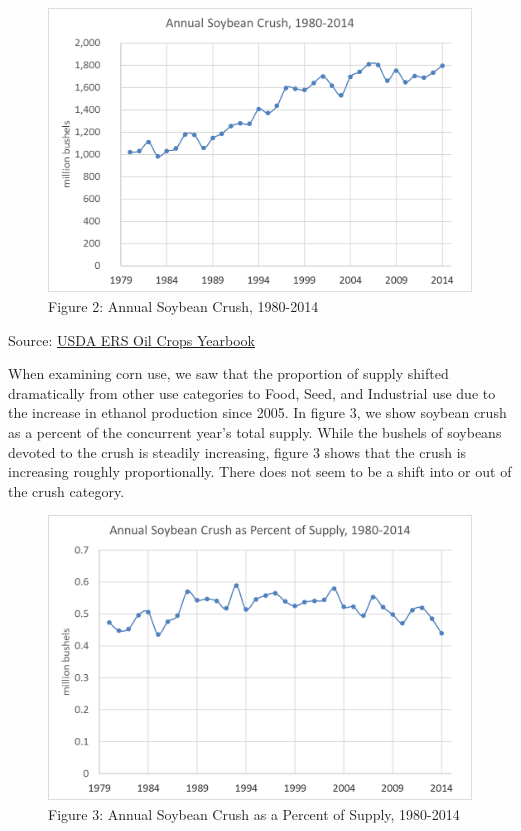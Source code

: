 \documentclass[]{book}
\theoremstyle{definition}
\theoremstyle{definition}
\theoremstyle{remark}
\begin{document}
\begin{figure}[htbp]
\centering
\includegraphics{Excel-files/ForecastingUseSoy-OilCropsYearbook_files/image005.png}
\caption{Figure 2: Annual Soybean Crush, 1980-2014}
\end{figure}

Source:
\href{http://www.ers.usda.gov/data-products/oil-crops-yearbook.aspx}{USDA
ERS Oil Crops Yearbook}

When examining corn use, we saw that the proportion of supply shifted
dramatically from other use categories to Food, Seed, and Industrial use
due to the increase in ethanol production since 2005. In figure 3, we
show soybean crush as a percent of the concurrent year's total supply.
While the bushels of soybeans devoted to the crush is steadily
increasing, figure 3 shows that the crush is increasing roughly
proportionally. There does not seem to be a shift into or out of the
crush category.

\begin{figure}[htbp]
\centering
\includegraphics{Excel-files/ForecastingUseSoy-OilCropsYearbook_files/image007.png}
\caption{Figure 3: Annual Soybean Crush as a Percent of Supply,
1980-2014}
\end{figure}
\end{document}
